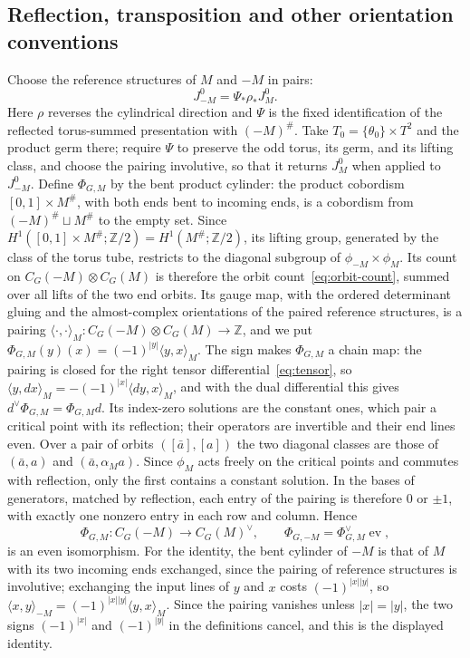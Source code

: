 \documentclass[11pt]{amsart}
\theoremstyle{definition}
\theoremstyle{remark}
\theoremstyle{plain}
\numberwithin{equation}{section}
\newcommand{\ZZ}{\mathbb Z}
\newcommand{\ev}{\operatorname{ev}}
\begin{document}
\subsection{Reflection, transposition and other orientation conventions}
Choose the reference structures of $M$ and $-M$ in pairs:
\[
 J^0_{-M}=\Psi_*\rho_*J^0_M.
\]
Here $\rho$ reverses the cylindrical direction and $\Psi$
is the fixed identification of the reflected torus-summed
presentation with $(-M)^\#$. Take $T_0=\{\theta_0\}\times T^2$
and the product germ there; require $\Psi$ to preserve the
odd torus, its germ, and its lifting class, and choose the pairing
involutive, so that it returns $J^0_M$ when applied to $J^0_{-M}$.
Define $\Phi_{G,M}$ by the bent product cylinder: the product
cobordism $[0,1]\times M^\#$, with both ends bent to incoming ends, is
a cobordism from $(-M)^\#\sqcup M^\#$ to the empty set. Since
$H^1([0,1]\times M^\#;\ZZ/2)=H^1(M^\#;\ZZ/2)$, its lifting group,
generated by the class of the torus tube, restricts to the diagonal
subgroup of $\phi_{-M}\times\phi_M$. Its count on
$C_G(-M)\otimes C_G(M)$ is therefore the orbit
count~\eqref{eq:orbit-count}, summed over all lifts of the two end
orbits. Its gauge map,
with the ordered determinant gluing and the almost-complex orientations
of the paired reference structures, is a pairing
$\langle\cdot,\cdot\rangle_M:C_G(-M)\otimes C_G(M)\to\ZZ$, and we put
$\Phi_{G,M}(y)(x)=(-1)^{|y|}\langle y,x\rangle_M$. The sign makes
$\Phi_{G,M}$ a chain map: the pairing is closed for the right tensor
differential~\eqref{eq:tensor}, so
$\langle y,dx\rangle_M=-(-1)^{|x|}\langle dy,x\rangle_M$, and with the dual
differential this gives $d^\vee\Phi_{G,M}=\Phi_{G,M}d$. Its index-zero solutions are
the constant ones, which pair a critical point with its reflection;
their operators are invertible and their end lines even. Over a pair
of orbits $([\bar a],[a])$ the two diagonal classes are those of
$(\bar a,a)$ and $(\bar a,\alpha_Ma)$. Since $\phi_M$ acts freely on
the critical points and commutes with reflection, only the first
contains a constant solution. In the bases of generators, matched by
reflection, each entry of the pairing is therefore $0$ or $\pm1$, with
exactly one nonzero entry in each row and column. Hence
\begin{equation}\label{eq:gauge-duality}
 \Phi_{G,M}:C_G(-M)\longrightarrow C_G(M)^\vee,
 \qquad \Phi_{G,-M}=\Phi_{G,M}^\vee\ev,
\end{equation}
is an even isomorphism. For the identity, the bent cylinder of $-M$ is
that of $M$ with its two incoming ends exchanged, since the pairing of
reference structures is involutive; exchanging the input lines of $y$ and $x$ costs
$(-1)^{|x||y|}$, so $\langle x,y\rangle_{-M}=(-1)^{|x||y|}\langle
y,x\rangle_M$. Since the pairing vanishes unless $|x|=|y|$, the two signs
$(-1)^{|x|}$ and $(-1)^{|y|}$ in the definitions cancel, and this is the
displayed identity.
\end{document}
